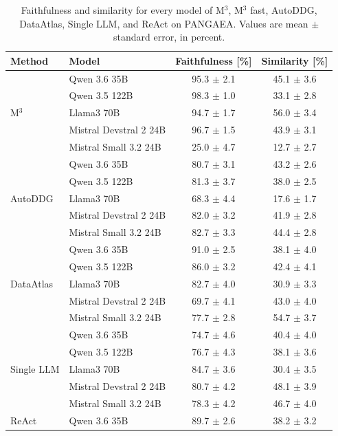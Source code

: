 \begin{table}
\caption{Faithfulness and similarity for every model of M$^3$, M$^3$ fast, AutoDDG, DataAtlas, Single LLM, and ReAct on PANGAEA. Values are mean $\pm$ standard error, in percent.}
\label{tab:all_models_descriptive}
\begin{tabular}{llcc}
\toprule
Method & Model & Faithfulness [\%] & Similarity [\%] \\
\midrule
\multirow[t]{5}{*}{M$^3$} & Qwen 3.6 35B & 95.3 $\pm$ 2.1 & 45.1 $\pm$ 3.6 \\
 & Qwen 3.5 122B & 98.3 $\pm$ 1.0 & 33.1 $\pm$ 2.8 \\
 & Llama3 70B & 94.7 $\pm$ 1.7 & 56.0 $\pm$ 3.4 \\
 & Mistral Devstral 2 24B & 96.7 $\pm$ 1.5 & 43.9 $\pm$ 3.1 \\
 & Mistral Small 3.2 24B & 25.0 $\pm$ 4.7 & 12.7 $\pm$ 2.7 \\
\midrule
\multirow[t]{5}{*}{AutoDDG} & Qwen 3.6 35B & 80.7 $\pm$ 3.1 & 43.2 $\pm$ 2.6 \\
 & Qwen 3.5 122B & 81.3 $\pm$ 3.7 & 38.0 $\pm$ 2.5 \\
 & Llama3 70B & 68.3 $\pm$ 4.4 & 17.6 $\pm$ 1.7 \\
 & Mistral Devstral 2 24B & 82.0 $\pm$ 3.2 & 41.9 $\pm$ 2.8 \\
 & Mistral Small 3.2 24B & 82.7 $\pm$ 3.3 & 44.4 $\pm$ 2.8 \\
\midrule
\multirow[t]{5}{*}{DataAtlas} & Qwen 3.6 35B & 91.0 $\pm$ 2.5 & 38.1 $\pm$ 4.0 \\
 & Qwen 3.5 122B & 86.0 $\pm$ 3.2 & 42.4 $\pm$ 4.1 \\
 & Llama3 70B & 82.7 $\pm$ 4.0 & 30.9 $\pm$ 3.3 \\
 & Mistral Devstral 2 24B & 69.7 $\pm$ 4.1 & 43.0 $\pm$ 4.0 \\
 & Mistral Small 3.2 24B & 77.7 $\pm$ 2.8 & 54.7 $\pm$ 3.7 \\
\midrule
\multirow[t]{5}{*}{Single LLM} & Qwen 3.6 35B & 74.7 $\pm$ 4.6 & 40.4 $\pm$ 4.0 \\
 & Qwen 3.5 122B & 76.7 $\pm$ 4.3 & 38.1 $\pm$ 3.6 \\
 & Llama3 70B & 84.7 $\pm$ 3.6 & 30.4 $\pm$ 3.5 \\
 & Mistral Devstral 2 24B & 80.7 $\pm$ 4.2 & 48.1 $\pm$ 3.9 \\
 & Mistral Small 3.2 24B & 78.3 $\pm$ 4.2 & 46.7 $\pm$ 4.0 \\
\midrule
\multirow[t]{5}{*}{ReAct} & Qwen 3.6 35B & 89.7 $\pm$ 2.6 & 38.2 $\pm$ 3.2 \\

\end{tabular}
\end{table}

